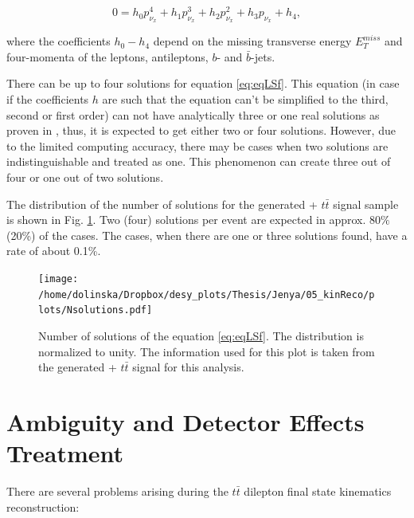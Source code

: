\begin{equation}\label{eq:eqLSf}
 0 = h_{0} p_{\nu_{x}}^{4} + h_{1} p_{\nu_{x}}^{3} + h_{2} p_{\nu_{x}}^{2} + h_{3} p_{\nu_{x}} + h_{4},
\end{equation}

where the coefficients $h_{0} - h_{4}$ \cite{LSpaper, LSerrat} depend on the missing transverse energy $E_{T}^{miss}$ and four-momenta of the
leptons, antileptons, $b$- and $\bar{b}$-jets. 

There can be up to four solutions for equation \ref{eq:eqLSf}. This equation (in case if the coefficients $h$ are such that the equation can't be simplified to the third, second
or first order) can not have analytically three or one real solutions as proven in \cite{LSpaper}, thus, it is expected to get either two or four solutions. However, due to the 
limited computing accuracy, there may be cases when two solutions are indistinguishable and treated as one. This phenomenon can create three out of four or one out of two solutions.

The distribution of the number of solutions for the generated \MG + \PYTHIA $t\bar{t}$ signal sample 
is shown in Fig. \ref{fig:LSNsol}. Two (four) solutions per event are expected in approx. 80$\%$ (20\%) of the cases.
The cases, when there are one or three solutions found, have a rate of about 0.1\%.

\begin{figure}[t]
  \centering
  \texttt{[image: /home/dolinska/Dropbox/desy\_plots/Thesis/Jenya/05\_kinReco/plots/Nsolutions.pdf]}
  \caption{Number of solutions of the equation \ref{eq:eqLSf}. The distribution is normalized to unity. The information used for this plot is taken
  from the generated \MG + \PYTHIA $t\bar{t}$ signal for this analysis.}
  \label{fig:LSNsol}
\end{figure}



\section{Ambiguity and Detector Effects Treatment}\label{sec:SolSer}

There are several problems arising during the $t\bar{t}$ dilepton final state kinematics reconstruction:

